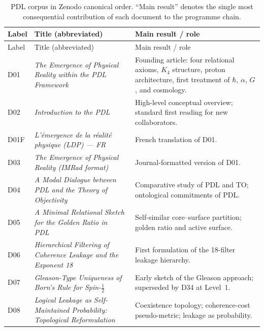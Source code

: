 \documentclass[11pt,a4paper]{article}
\theoremstyle{plain}
\theoremstyle{definition}
\theoremstyle{remark}
\newcommand{\Kfour}{K_4}
\begin{document}
\begin{longtable}{@{}L{1.3cm}L{3.8cm}L{8.0cm}@{}}
\caption{PDL corpus in Zenodo canonical order.  ``Main result'' denotes the single most consequential contribution of each document to the programme chain.}
\label{tab:documents}\\
\toprule
Label & Title (abbreviated) & Main result / role \\
\midrule
\endfirsthead
\toprule
Label & Title (abbreviated) & Main result / role \\
\midrule
\endhead
\bottomrule
\endfoot

D01 & \textit{The Emergence of Physical Reality within the PDL Framework}~\citep{D01} & Founding article: four relational axioms, $\Kfour$ structure, proton architecture, first treatment of $\hbar$, $\alpha$, $G$, and cosmology. \\[0.3em]

D02 & \textit{Introduction to the PDL}~\citep{D02} & High-level conceptual overview; standard first reading for new collaborators. \\[0.3em]

D01F & \textit{L'\'emergence de la r\'ealit\'e physique (LDP) — FR}~\citep{D01F} & French translation of D01. \\[0.3em]

D03 & \textit{The Emergence of Physical Reality (IMRad format)}~\citep{D03} & Journal-formatted version of D01. \\[0.3em]

D04 & \textit{A Modal Dialogue between PDL and the Theory of Objectivity}~\citep{D04} & Comparative study of PDL and TO; ontological commitments of PDL. \\[0.3em]

D05 & \textit{A Minimal Relational Sketch for the Golden Ratio in PDL}~\citep{D05} & Self-similar core--surface partition; golden ratio and active surface. \\[0.3em]

D06 & \textit{Hierarchical Filtering of Coherence Leakage and the Exponent 18}~\citep{D06} & First formulation of the 18-filter leakage hierarchy. \\[0.3em]

D07 & \textit{Gleason-Type Uniqueness of Born's Rule for Spin-$\tfrac{1}{2}$}~\citep{D07} & Early sketch of the Gleason approach; superseded by D34 at Level~1. \\[0.3em]

D08 & \textit{Logical Leakage as Self-Maintained Probability: Topological Reformulation}~\citep{D08} & Coexistence topology; coherence-cost pseudo-metric; leakage as probability. \\[0.3em]


\end{longtable}
\end{document}
